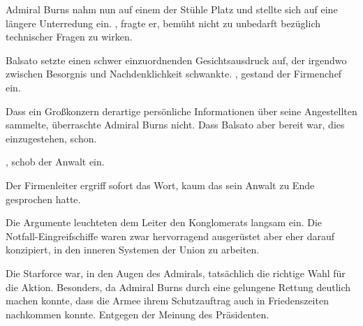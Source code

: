 \par

Admiral Burns nahm nun auf einem der Stühle Platz und stellte sich auf eine längere Unterredung ein. , fragte er, bemüht nicht zu unbedarft bezüglich technischer Fragen zu wirken.

\par

Balsato setzte einen schwer einzuordnenden Gesichtsausdruck auf, der irgendwo zwischen Besorgnis und Nachdenklichkeit schwankte. , gestand der Firmenchef ein. 

\par

Dass ein Großkonzern derartige persönliche Informationen über seine Angestellten sammelte, überraschte Admiral Burns nicht. Dass Balsato aber bereit war, dies einzugestehen, schon.

\par

, schob der Anwalt ein. 

\par

Der Firmenleiter ergriff sofort das Wort, kaum das sein Anwalt zu Ende gesprochen hatte. 

\par

Die Argumente leuchteten dem Leiter den Konglomerats langsam ein. Die Notfall-Eingreifschiffe waren zwar hervorragend ausgerüstet aber eher darauf konzipiert, in den inneren Systemen der Union zu arbeiten.

\par

Die Starforce war, in den Augen des Admirals, tatsächlich die richtige Wahl für die Aktion. Besonders, da Admiral Burns durch eine gelungene Rettung deutlich machen konnte, dass die Armee ihrem Schutzauftrag auch in Friedenszeiten nachkommen konnte. Entgegen der Meinung des Präsidenten.

